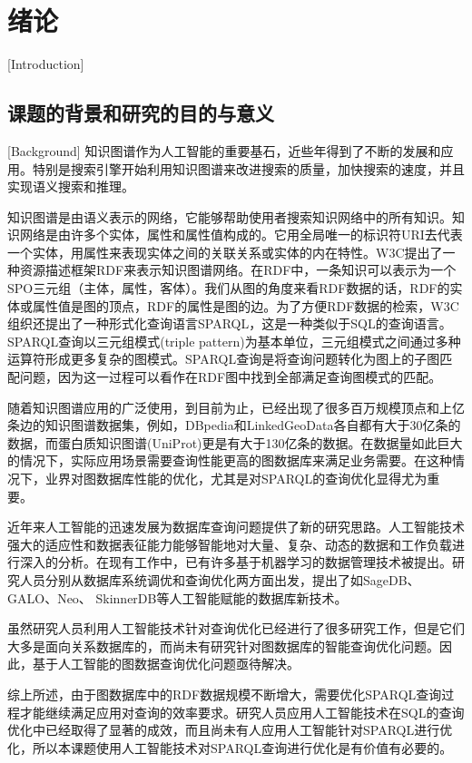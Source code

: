 
\chapter{绪论}[Introduction]

\section{课题的背景和研究的目的与意义}[Background]
知识图谱作为人工智能的重要基石，近些年得到了不断的发展和应用。特别是搜索引擎开始利用知识图谱来改进搜索的质量，加快搜索的速度，并且实现语义搜索和推理。

知识图谱是由语义表示的网络，它能够帮助使用者搜索知识网络中的所有知识。知识网络是由许多个实体，属性和属性值构成的。它用全局唯一的标识符URI去代表一个实体，用属性来表现实体之间的关联关系或实体的内在特性。W3C提出了一种资源描述框架RDF\cite{rdf}来表示知识图谱网络。在RDF中，一条知识可以表示为一个SPO三元组（主体，属性，客体）。我们从图的角度来看RDF数据的话，RDF的实体或属性值是图的顶点，RDF的属性是图的边。为了方便RDF数据的检索，W3C组织还提出了一种形式化查询语言SPARQL\cite{sparql}，这是一种类似于SQL的查询语言。SPARQL查询以三元组模式(triple pattern)为基本单位，三元组模式之间通过多种运算符形成更多复杂的图模式。SPARQL查询是将查询问题转化为图上的子图匹配问题，因为这一过程可以看作在RDF图中找到全部满足查询图模式的匹配。

随着知识图谱应用的广泛使用，到目前为止，已经出现了很多百万规模顶点和上亿条边的知识图谱数据集\cite{MassiveData}，例如，DBpedia和LinkedGeoData各自都有大于30亿条的数据，而蛋白质知识图谱(UniProt)更是有大于130亿条的数据。在数据量如此巨大的情况下，实际应用场景需要查询性能更高的图数据库来满足业务需要。在这种情况下，业界对图数据库性能的优化，尤其是对SPARQL的查询优化显得尤为重要。

近年来人工智能的迅速发展为数据库查询问题提供了新的研究思路\cite{MLforDB}。人工智能技术强大的适应性和数据表征能力能够智能地对大量、复杂、动态的数据和工作负载进行深入的分析。在现有工作中，已有许多基于机器学习的数据管理技术被提出。研究人员分别从数据库系统调优和查询优化两方面出发，提出了如SageDB\cite{SageDB}、GALO\cite{GALO}、Neo\cite{Neo}、
SkinnerDB\cite{SkinnerDB}等人工智能赋能的数据库新技术。

虽然研究人员利用人工智能技术针对查询优化已经进行了很多研究工作，但是它们大多是面向关系数据库的，而尚未有研究针对图数据库的智能查询优化问题。因此，基于人工智能的图数据查询优化问题亟待解决。

综上所述，由于图数据库中的RDF数据规模不断增大，需要优化SPARQL查询过程才能继续满足应用对查询的效率要求。研究人员应用人工智能技术在SQL的查询优化中已经取得了显著的成效，而且尚未有人应用人工智能针对SPARQL进行优化，所以本课题使用人工智能技术对SPARQL查询进行优化是有价值有必要的。


